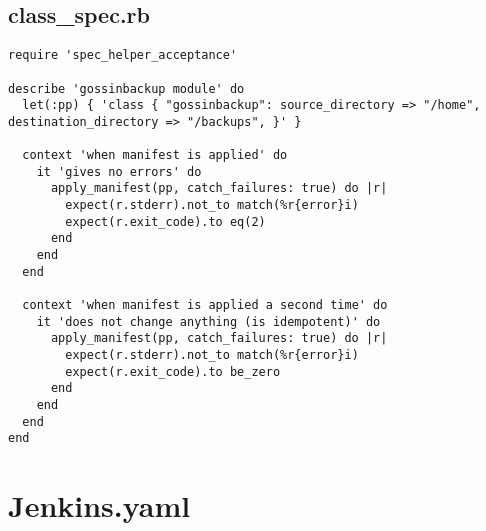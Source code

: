 \subsection{class\_spec.rb}

\begin{verbatim}
require 'spec_helper_acceptance'

describe 'gossinbackup module' do
  let(:pp) { 'class { "gossinbackup": source_directory => "/home", destination_directory => "/backups", }' }

  context 'when manifest is applied' do
    it 'gives no errors' do
      apply_manifest(pp, catch_failures: true) do |r|
        expect(r.stderr).not_to match(%r{error}i)
        expect(r.exit_code).to eq(2)
      end
    end
  end

  context 'when manifest is applied a second time' do
    it 'does not change anything (is idempotent)' do
      apply_manifest(pp, catch_failures: true) do |r|
        expect(r.stderr).not_to match(%r{error}i)
        expect(r.exit_code).to be_zero
      end
    end
  end
end
\end{verbatim}

\section{Jenkins.yaml} \label{jenkinsyaml}

